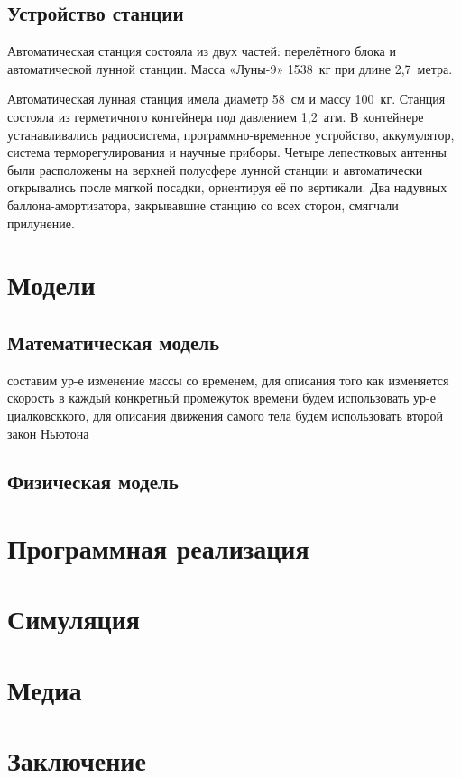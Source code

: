 \subsection{Устройство станции}
\noindent Автоматическая станция состояла из двух частей: перелётного блока и автоматической лунной станции. Масса «Луны-9» 1538 кг при длине 2,7 метра.

\noindent Автоматическая лунная станция имела диаметр 58 см и массу 100 кг. Станция состояла из герметичного контейнера под давлением 1,2 атм. В контейнере устанавливались радиосистема, программно-временное устройство, аккумулятор, система терморегулирования и научные приборы. Четыре лепестковых антенны были расположены на верхней полусфере лунной станции и автоматически открывались после мягкой посадки, ориентируя её по вертикали. Два надувных баллона-амортизатора, закрывавшие станцию со всех сторон, смягчали прилунение. 
\section{Модели}
\subsection{Математическая модель}
 составим ур-е изменение массы со временем, для описания того как изменяется скорость в каждый конкретный промежуток времени будем использовать ур-е циалковсккого, для описания движения самого тела будем использовать второй закон Ньютона
\subsection{Физическая модель}

\section{Программная реализация}

\section{Симуляция}

\section{Медиа}

\section*{Заключение}

